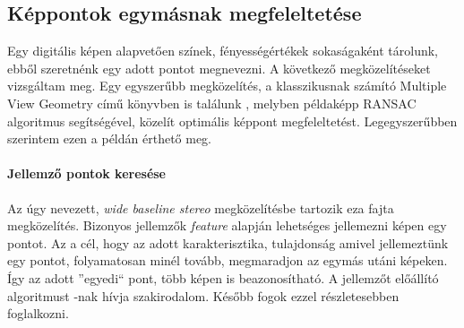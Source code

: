 \documentclass[12pt,a4paper,oneside]{report} %
\begin{document}
\subsection{Képpontok egymásnak megfeleltetése}
Egy digitális képen alapvetően színek, fényességértékek sokaságaként tárolunk, ebből szeretnénk egy adott pontot megnevezni. A következő megközelítéseket vizsgáltam meg. Egy egyszerűbb megközelítés, a klasszikusnak számító Multiple View Geometry című könyvben is találunk \cite[ó.~140]{hartley2003multiple}, melyben példaképp RANSAC \cite{derpanis2010overview} algoritmus segítségével, közelít optimális képpont megfeleltetést. Legegyszerűbben szerintem ezen a példán érthető meg.

\paragraph{Jellemző pontok keresése}
Az úgy nevezett, \textit{wide baseline stereo} megközelítésbe tartozik eza fajta megközelítés.
Bizonyos jellemzők \textit{feature} alapján lehetséges jellemezni képen egy pontot. Az a cél, hogy az adott karakterisztika, tulajdonság amivel jellemeztünk egy pontot, folyamatosan minél tovább, megmaradjon az egymás utáni képeken. Így az adott ''egyedi`` pont, több képen is beazonosítható. A jellemzőt előállító algoritmust -nak hívja szakirodalom. Később fogok  ezzel részletesebben foglalkozni.
\end{document}
